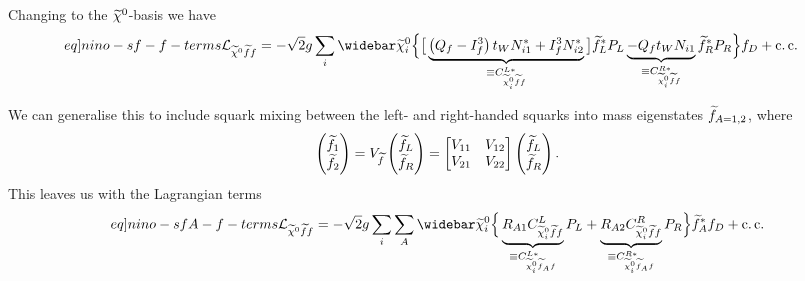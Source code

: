 \documentclass[english, notitlepage]{article}
\begin{document}
Changing to the \(\nino[]\)-basis we have
\begin{align}
    \label[eq]{nino-sf-f-terms}
    \L_{\nino[]\wtilde{f}f} = -\sqrt{2} g \sum_{i} \wbar{\wtilde{\chi}}^0_i
     &
    \Big\{ \big[ \underbrace{\pclosed{Q_f - I^3_f}t_W N_{i1}^\ast  + I^3_f
            N_{i2}^\ast}_{\equiv C_{\nino[i] \wtilde{f} f}^{L\ast}} \big]
    \wtilde{f}_L^\ast
    P_L \underbrace{- Q_f t_W N_{i1}}_{\equiv C_{\nino[i] \wtilde{f}
                f}^{R\ast}}
    \wtilde{f}_R^\ast P_R \Big\} f_D + \cc
\end{align}

We can generalise this to include squark mixing between the left- and
right-handed squarks into mass eigenstates \(\wtilde{f}_{A=1,2}\), where
\begin{align}
    \begin{pmatrix}
        \wtilde{f}_1 \\
        \wtilde{f}_2
    \end{pmatrix}
    =
    V_{\wtilde{f}} \begin{pmatrix}
                       \wtilde{f}_L \\
                       \wtilde{f}_R
                   \end{pmatrix}
    =
    \begin{bmatrix}
        V_{11} & V_{12} \\
        V_{21} & V_{22}
    \end{bmatrix}
    \begin{pmatrix}
        \wtilde{f}_L \\
        \wtilde{f}_R
    \end{pmatrix}.
\end{align}
This leaves us with the Lagrangian terms
\begin{align}
    \label[eq]{nino-sfA-f-terms}
    \L_{\nino[] \wtilde{f} f} = -\sqrt{2} g \sum_{i} \sum_{A}
    \wbar{\wtilde{\chi}}^0_i & \Big\{ \underbrace{R_{A1} C_{\nino[i]
                \wtilde{f}
                f}^{L}}_{\equiv C_{\nino[i] \wtilde{f}_A f}^{L\ast}} P_L +
    \underbrace{R_{A2}
        C_{\nino[i] \wtilde{f} f}^{R}}_{\equiv C_{\nino[i] \wtilde{f}_A
                f}^{R\ast}} P_R
    \Big\} \wtilde{f}_A^\ast f_D + \cc
    \\
\end{align}
\end{document}
